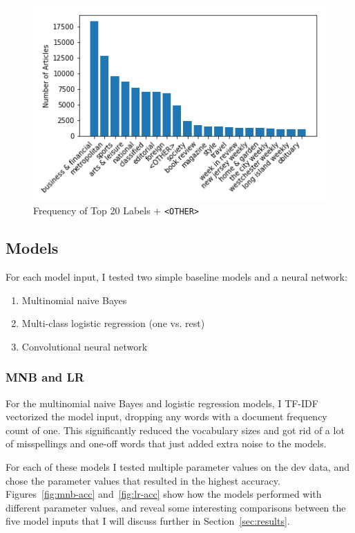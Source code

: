 \documentclass[11pt,a4paper,table]{article}
\begin{document}
\begin{figure}
\centering
\includegraphics[scale=0.57]{top_n_labels_histogram}
\caption{Frequency of Top 20 Labels + \small{\tt <OTHER>}}
\label{fig:topnhist}
\end{figure}

\subsection{Models}
\label{sec:models}

For each model input, I tested two simple baseline models and a neural network:

\begin{enumerate}
\item Multinomial naive Bayes
\item Multi-class logistic regression (one vs. rest)
\item Convolutional neural network
\end{enumerate}

\subsubsection{MNB and LR}
\label{sssec:mnb-lr}

For the multinomial naive Bayes and logistic regression models, I TF-IDF vectorized the model input, dropping any words with a document frequency count of one. This significantly reduced the vocabulary sizes and got rid of a lot of misspellings and one-off words that just added extra noise to the models.

For each of these models I tested multiple parameter values on the dev data, and chose the parameter values that resulted in the highest accuracy. Figures~\ref{fig:mnb-acc} and~\ref{fig:lr-acc} show how the models performed with different parameter values, and reveal some interesting comparisons between the five model inputs that I will discuss further in Section~\ref{sec:results}.
\end{document}

